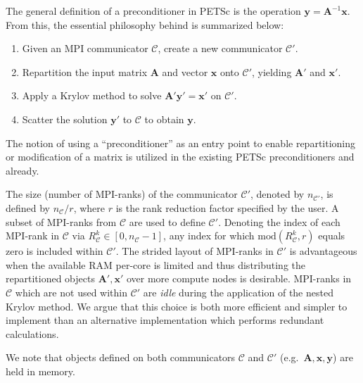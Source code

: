 \documentclass[]{siamart0216}
\newcommand{\dmat}[1]{\mathbf{#1}}
\newcommand{\dvec}[1]{\mathbf{#1}}
\begin{document}
The general definition of a preconditioner in PETSc is the operation $\dvec y = \dmat A^{-1} \dvec x$.
From this, the essential philosophy behind  is summarized below: 
\begin{enumerate}
\setlength\itemsep{0em}
\item Given an MPI communicator $\mathcal C$, create a new communicator $\mathcal C'$.
\item Repartition the input matrix $\dmat A$ and vector $\dvec x$ onto $\mathcal C'$, yielding $\dmat A'$ and $\dvec x'$. 
\item Apply a Krylov method to solve $\dmat A' \dvec y' = \dvec x'$ on $\mathcal C'$.
\item Scatter the solution $\dvec y'$ to $\mathcal C$ to obtain $\dvec y$.
\end{enumerate}
The notion of using a ``preconditioner'' as an entry point to enable repartitioning or modification of a matrix 
is utilized in the existing PETSc preconditioners  and  already.





The size (number of MPI-ranks) of the communicator $\mathcal C'$, denoted by $n_{\mathcal C'}$, 
is defined by $n_{\mathcal C} / r$, where $r$ is the rank reduction factor specified by the user. 
A subset of MPI-ranks from $\mathcal C$ are used to define $\mathcal C'$.
Denoting the index of each MPI-rank in $\mathcal C$ via $R_{\mathcal C}^k \in [0,n_{\mathcal C}-1]$, 
any index for which  $\text{mod}(R_{\mathcal C}^k , r)$ equals zero is included within $\mathcal C'$.
The strided layout of MPI-ranks in $\mathcal C'$ is advantageous when the available RAM per-core 
is limited and thus distributing the repartitioned objects $\dmat A', \dvec x'$ over more compute nodes is desirable.
MPI-ranks in $\mathcal C$ which are not used within $\mathcal C'$ are \textit{idle} during the 
application of the nested Krylov method. 
We argue that this choice is both more efficient and simpler to implement than an alternative implementation 
which performs redundant calculations. 


We note that objects defined on both communicators $\mathcal C$ and $\mathcal C'$ (e.g.~$\dmat A, \dvec x, \dvec y$) are held in memory.
\end{document}

